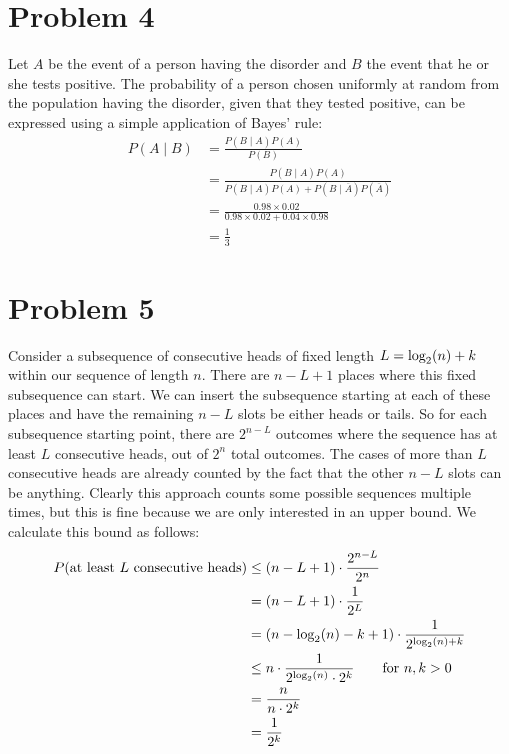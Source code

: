 \documentclass[11pt]{article}
\let\origleft\left
\let\origright\right
\renewcommand{\left}{\mathopen{}\mathclose\bgroup\origleft}
\renewcommand{\right}{\aftergroup\egroup\origright}
\newcommand{\p}[1]{\left(#1\right)}
\newcommand{\logb}[2]{\text{log}_{#1}\p{#2}}
\begin{document}
\newpage
\section*{Problem 4}
Let $A$ be the event of a person having the disorder and $B$ the event that he or she tests positive. The probability of a person chosen uniformly at random from the population having the disorder, given that they tested positive, can be expressed using a simple application of Bayes' rule:
\begin{align*}
P(A \mid B) &= \frac{P(B \mid A)P(A)}{P(B)}\\
&= \frac{P(B \mid A)P(A)}{P(B \mid A)P(A)+P(B \mid \overline{A})P(\overline{A})}\\
&= \frac{0.98 \times 0.02}{0.98 \times 0.02 + 0.04 \times 0.98}\\
&= \frac 13
\end{align*}


\newpage
\section*{Problem 5}
Consider a subsequence of consecutive heads of fixed length $L = \logb2n + k$ within our sequence of length $n$. There are $n-L+1$ places where this fixed subsequence can start. We can insert the subsequence starting at each of these places and have the remaining $n-L$ slots be either heads or tails. So for each subsequence starting point, there are $2^{n-L}$ outcomes where the sequence has at least $L$ consecutive heads, out of $2^n$ total outcomes. The cases of more than $L$ consecutive heads are already counted by the fact that the other $n-L$ slots can be anything. Clearly this approach counts some possible sequences multiple times, but this is fine because we are only interested in an upper bound. We calculate this bound as follows:
\begin{align*}
P(\text{at least }L\text{ consecutive heads}) &\leq (n-L+1)\cdot\frac{2^{n-L}}{2^n}\\
&= (n-L+1)\cdot\frac1{2^L}\\
&= (n-\logb2n-k+1)\cdot\frac1{2^{\logb2n + k}}\\
&\leq n\cdot\frac{1}{2^{\logb2n}\cdot 2^k}\qquad \text{for } n,k > 0\\
&= \frac n{n\cdot 2^k}\\
&= \frac1{2^k}
\end{align*}
\end{document}
